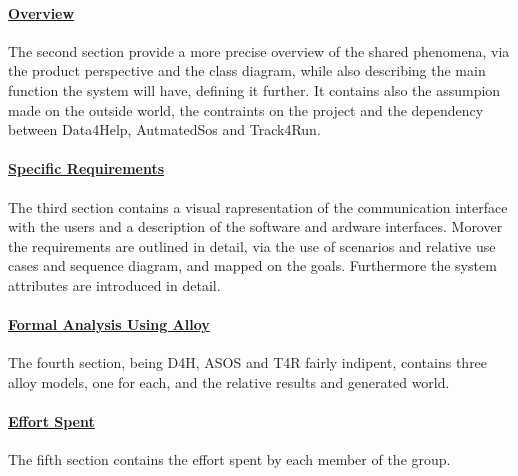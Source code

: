 \paragraph{\hyperref[sect:overview]{Overview}} The second section provide a more precise overview of the shared phenomena, via the product perspective and the class diagram, while also describing the main function the system will have, defining it further. It contains also the assumpion made on the outside world, the contraints on the project and the dependency between Data4Help, AutmatedSos and Track4Run.
\paragraph{\hyperref[sect:requirements]{Specific Requirements}} The third section contains a visual rapresentation of the communication interface with the users and a description of the software and ardware interfaces. Morover the requirements are outlined in detail, via the use of scenarios and relative use cases and sequence diagram, and mapped on the goals. Furthermore the system attributes are introduced in detail.
\paragraph{\hyperref[sect:alloy]{Formal Analysis Using Alloy}} The fourth section, being D4H, ASOS and T4R fairly indipent, contains three alloy models, one for each, and the relative results and generated world.
\paragraph{\hyperref[sect:effort]{Effort Spent}} The fifth section contains the effort spent by each member of the group.


